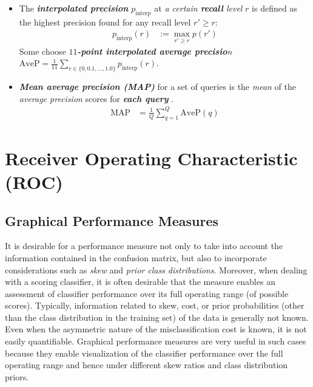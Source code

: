 \documentclass[11pt]{article}
\begin{document}
\begin{itemize}
\item The \emph{\textbf{interpolated precision}} $p_{\text{interp}}$ at \emph{a certain \textbf{recall} level} $r$ is defined as the highest precision found for any recall level $r' \ge r$:
\begin{align}
p_{\text{interp}}(r)&:= \max_{r' \ge r}p(r')  \label{eqn: interpolated_precision}
\end{align} Some choose \emph{\textbf{$11$-point interpolated average precisio}n} $\text{AveP} = \frac{1}{11}\sum_{r \in \{0, 0.1,\ldots, 1.0 \} }p_{\text{interp}}(r)$.


\item \emph{\textbf{Mean average precision (MAP)}} for a set of queries is the \emph{mean} of the \emph{average precision} scores for \emph{\textbf{each query}} \citep{manning2008introduction}.
\begin{align}
\text{MAP} &= \frac{1}{Q}\sum_{q=1}^{Q}\text{AveP}(q) \label{eqn: mean_average_precision}
\end{align}
\end{itemize}

\section{Receiver Operating Characteristic (ROC)}
\subsection{Graphical Performance Measures}
It is desirable for a performance measure not only to take into account the information contained in the confusion matrix, but also to incorporate considerations such as \emph{skew} and \emph{prior class distributions}. Moreover, when dealing with a scoring classifier, it is often desirable that the measure enables an assessment of classifier performance over its full operating range (of possible scores).   Typically, information related to skew, cost, or prior probabilities (other than the class distribution in the training set) of the data is generally not known. Even when the asymmetric nature of the misclassification cost is known, it is not easily quantifiable. Graphical performance measures are very useful in such cases because they enable visualization of the classifier performance over the full operating range and hence under different skew ratios and class distribution priors.
\end{document}
